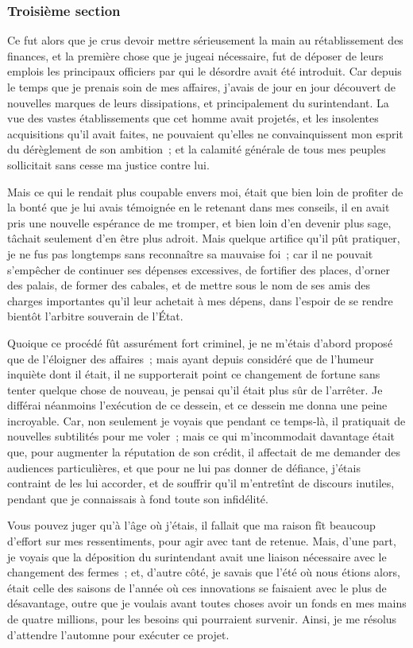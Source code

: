 \documentclass[french,twoside]{book} %
\begin{document}
\subsubsection[{Troisième section}]{Troisième section}
\noindent Ce fut alors que je crus devoir mettre sérieusement la main au rétablissement des finances, et la première chose que je jugeai nécessaire, fut de déposer de leurs emplois les principaux officiers par qui le désordre avait été introduit. Car depuis le temps que je prenais soin de mes affaires, j’avais de jour en jour découvert de nouvelles marques de leurs dissipations, et principalement du surintendant. La vue des vastes établissements que cet homme avait projetés, et les insolentes acquisitions qu’il avait faites, ne pouvaient qu’elles ne convainquissent mon esprit du dérèglement de son ambition ; et la calamité générale de tous mes peuples sollicitait sans cesse ma justice contre lui.\par
Mais ce qui le rendait plus coupable envers moi, était que bien loin de profiter de la bonté que je lui avais témoignée en le retenant dans mes conseils, il en avait pris une nouvelle espérance de me tromper, et bien loin d’en devenir plus sage, tâchait seulement d’en être plus adroit. Mais quelque artifice qu’il pût pratiquer, je ne fus pas longtemps sans reconnaître sa mauvaise foi ; car il ne pouvait s’empêcher de continuer ses dépenses excessives, de fortifier des places, d’orner des palais, de former des cabales, et de mettre sous le nom de ses amis des charges importantes qu’il leur achetait à mes dépens, dans l’espoir de se rendre bientôt l’arbitre souverain de l’État.\par
Quoique ce procédé fût assurément fort criminel, je ne m’étais d’abord proposé que de l’éloigner des affaires ; mais ayant depuis considéré que de l’humeur inquiète dont il était, il ne supporterait point ce changement de fortune sans tenter quelque chose de nouveau, je pensai qu’il était plus sûr de l’arrêter. Je différai néanmoins l’exécution de ce dessein, et ce dessein me donna une peine incroyable. Car, non seulement je voyais que pendant ce temps-là, il pratiquait de nouvelles subtilités pour me voler ; mais ce qui m’incommodait davantage était que, pour augmenter la réputation de son crédit, il affectait de me demander des audiences particulières, et que pour ne lui pas donner de défiance, j’étais contraint de les lui accorder, et de souffrir qu’il m’entretînt de discours inutiles, pendant que je connaissais à fond toute son infidélité.\par
Vous pouvez juger qu’à l’âge où j’étais, il fallait que ma raison fît beaucoup d’effort sur mes ressentiments, pour agir avec tant de retenue. Mais, d’une part, je voyais que la déposition du surintendant avait une liaison nécessaire avec le changement des fermes ; et, d’autre côté, je savais que l’été où nous étions alors, était celle des saisons de l’année où ces innovations se faisaient avec le plus de désavantage, outre que je voulais avant toutes choses avoir un fonds en mes mains de quatre millions, pour les besoins qui pourraient survenir. Ainsi, je me résolus d’attendre l’automne pour exécuter ce projet.\par
\end{document}
